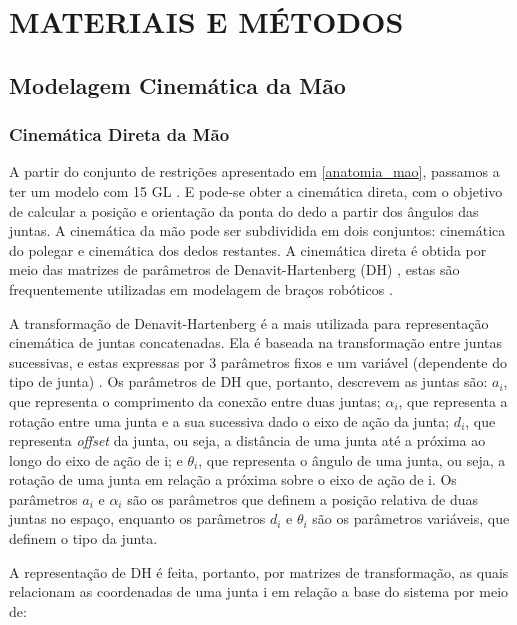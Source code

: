 
\chapter{MATERIAIS E MÉTODOS}\label{cap3}

\section{Modelagem Cinemática da Mão}

\subsection{Cinemática Direta da Mão}
\label{cinematica_direta_mao}
A partir do conjunto de restrições apresentado em \ref{anatomia_mao}, passamos a ter um modelo com 15 GL \cite{lin2000modeling}. E pode-se obter a cinemática direta, com o objetivo de calcular a posição e orientação da ponta do dedo a partir dos ângulos das juntas. A cinemática da mão pode ser subdividida em dois conjuntos: cinemática do polegar e cinemática dos dedos restantes. A cinemática direta é obtida por meio das matrizes de parâmetros de Denavit-Hartenberg (DH) \cite{hartenberg1964kinematic}, estas são frequentemente utilizadas em modelagem de braços robóticos \cite{cobos2008efficient}.

A transformação de Denavit-Hartenberg é a mais utilizada para representação cinemática de juntas concatenadas. Ela é baseada na transformação entre juntas sucessivas, e estas expressas por 3 parâmetros fixos e um variável (dependente do tipo de junta) \cite{newman2000calibration}. Os parâmetros de DH que, portanto, descrevem as juntas são: $a_i$, que representa o comprimento da conexão entre duas juntas; $\alpha_i$, que representa a rotação entre uma junta e a sua sucessiva dado o eixo de ação da junta; $d_i$, que representa \textit{offset} da junta, ou seja, a distância de uma junta até a próxima ao longo do eixo de ação de i; e $\theta_i$, que representa o ângulo de uma junta, ou seja, a rotação de uma junta em relação a próxima sobre o eixo de ação de i. Os parâmetros $a_i$ e $\alpha_i$ são os parâmetros que definem a posição relativa de duas juntas no espaço, enquanto os parâmetros $d_i$ e $\theta_i$ são os parâmetros variáveis, que definem o tipo da junta\cite{corke2007simple}.

A representação de DH é feita, portanto, por matrizes de transformação, as quais relacionam as coordenadas de uma junta i em relação a base do sistema por meio de:

